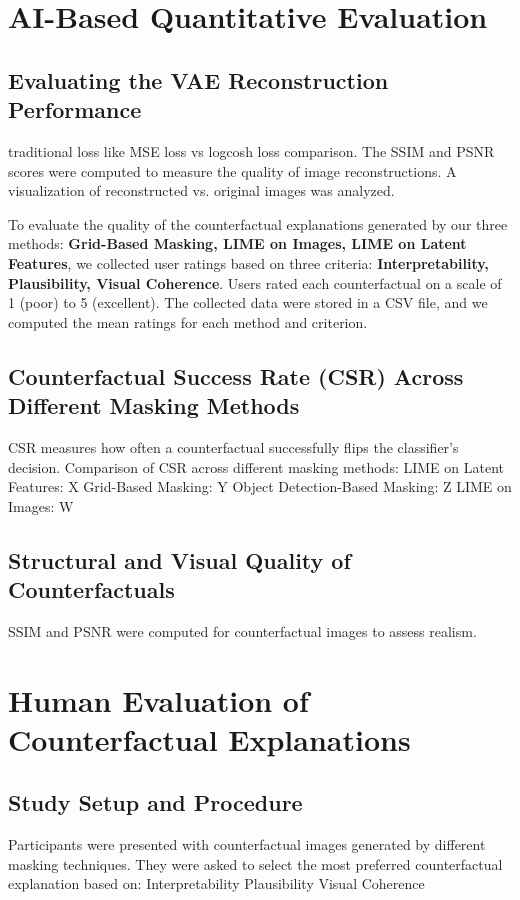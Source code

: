 \section{AI-Based Quantitative Evaluation}

\subsection{Evaluating the VAE Reconstruction Performance}
traditional loss like MSE loss vs logcosh loss comparison.
The SSIM and PSNR scores were computed to measure the quality of image reconstructions.
A visualization of reconstructed vs. original images was analyzed.

To evaluate the quality of the counterfactual explanations generated by our three methods: 
\textbf{Grid-Based Masking, LIME on Images, LIME on Latent Features}, we collected user ratings based on three criteria: 
\textbf{Interpretability, Plausibility, Visual Coherence}. Users rated each counterfactual on a scale of 1 (poor) to 5 (excellent). 
The collected data were stored in a CSV file, and we computed the mean ratings for each method and criterion.


\subsection{Counterfactual Success Rate (CSR) Across Different Masking Methods}
CSR measures how often a counterfactual successfully flips the classifier’s decision.
Comparison of CSR across different masking methods:
LIME on Latent Features: X%
Grid-Based Masking: Y%
Object Detection-Based Masking: Z%
LIME on Images: W%


\subsection{Structural and Visual Quality of Counterfactuals}
SSIM and PSNR were computed for counterfactual images to assess realism.






\section{Human Evaluation of Counterfactual Explanations} \label{section:Human Evaluation of Counterfactual Explanations}

\subsection{Study Setup and Procedure}
Participants were presented with counterfactual images generated by different masking techniques.
They were asked to select the most preferred counterfactual explanation based on:
Interpretability
Plausibility
Visual Coherence

